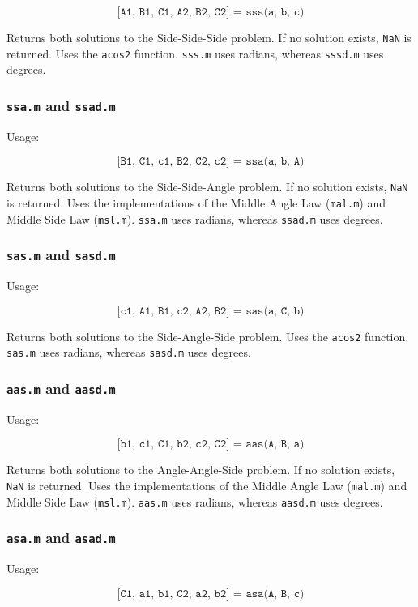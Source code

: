\documentclass{report}
\begin{document}
\[
         \texttt{[A1, B1, C1, A2, B2, C2] = sss(a, b, c)}
\]

Returns both solutions to the Side-Side-Side problem. If no
solution exists, \texttt{NaN} is returned. Uses the \texttt{acos2}
function. \texttt{sss.m} uses radians, whereas \texttt{sssd.m}
uses degrees.

\subsubsection{\texttt{ssa.m} and \texttt{ssad.m}}
Usage:

\[
         \texttt{[B1, C1, c1, B2, C2, c2] = ssa(a, b, A)}
\]

Returns both solutions to the Side-Side-Angle problem. If no
solution exists, \texttt{NaN} is returned. Uses the
implementations of the Middle Angle Law (\texttt{mal.m}) and
Middle Side Law (\texttt{msl.m}). \texttt{ssa.m} uses radians,
whereas \texttt{ssad.m} uses degrees.

\subsubsection{\texttt{sas.m} and \texttt{sasd.m}}
Usage:

\[
         \texttt{[c1, A1, B1, c2, A2, B2] = sas(a, C, b)}
\]

Returns both solutions to the Side-Angle-Side problem. Uses the
\texttt{acos2} function. \texttt{sas.m} uses radians, whereas
\texttt{sasd.m} uses degrees.

\subsubsection{\texttt{aas.m} and \texttt{aasd.m}}
Usage:

\[
         \texttt{[b1, c1, C1, b2, c2, C2] = aas(A, B, a)}
\]

Returns both solutions to the Angle-Angle-Side problem. If no
solution exists, \texttt{NaN} is returned. Uses the
implementations of the Middle Angle Law (\texttt{mal.m}) and
Middle Side Law (\texttt{msl.m}). \texttt{aas.m} uses radians,
whereas \texttt{aasd.m} uses degrees.

\subsubsection{\texttt{asa.m} and \texttt{asad.m}}
Usage:

\[
         \texttt{[C1, a1, b1, C2, a2, b2] = asa(A, B, c)}
\]
\end{document}
